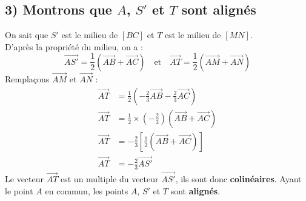 \documentclass{article}
\begin{document}
\subsection*{3) Montrons que $A$, $S'$ et $T$ sont alignés}
\noindent On sait que $S'$ est le milieu de $[BC]$ et $T$ est le milieu de $[MN]$. \\
D'après la propriété du milieu, on a :
\[ \overrightarrow{AS'} = \frac{1}{2}(\overrightarrow{AB} + \overrightarrow{AC}) \quad \text{et} \quad \overrightarrow{AT} = \frac{1}{2}(\overrightarrow{AM} + \overrightarrow{AN}) \]
\noindent Remplaçons $\overrightarrow{AM}$ et $\overrightarrow{AN}$ :
\begin{align*}
\overrightarrow{AT} &= \frac{1}{2}\left( -\frac{2}{3}\overrightarrow{AB} - \frac{2}{3}\overrightarrow{AC} \right) \\
\overrightarrow{AT} &= \frac{1}{2} \times \left( -\frac{2}{3} \right) (\overrightarrow{AB} + \overrightarrow{AC}) \\
\overrightarrow{AT} &= -\frac{2}{3} \left[ \frac{1}{2}(\overrightarrow{AB} + \overrightarrow{AC}) \right] \\
\overrightarrow{AT} &= -\frac{2}{3} \overrightarrow{AS'}
\end{align*}
\noindent Le vecteur $\overrightarrow{AT}$ est un multiple du vecteur $\overrightarrow{AS'}$, ils sont donc \textbf{colinéaires}. Ayant le point $A$ en commun, les points $A$, $S'$ et $T$ sont \textbf{alignés}.
\end{document}
